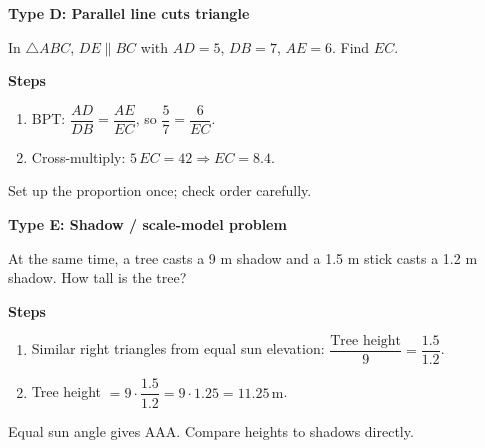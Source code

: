 \documentclass[11pt,a4paper]{article}
\begin{document}
\begin{examplebox}
\textbf{Type D: Parallel line cuts triangle}

In $\triangle ABC$, $DE\parallel BC$ with $AD=5$, $DB=7$, $AE=6$. Find $EC$.

\begin{center}
\end{center}

\textbf{Steps}
\begin{enumerate}
  \item BPT: $\dfrac{AD}{DB} = \dfrac{AE}{EC}$, so $\dfrac{5}{7} = \dfrac{6}{EC}$.
  \item Cross-multiply: $5\,EC = 42 \Rightarrow EC = 8.4$.
\end{enumerate}

\begin{shortcutbox}
Set up the proportion once; check order carefully.
\end{shortcutbox}
\end{examplebox}

\begin{examplebox}
\textbf{Type E: Shadow / scale-model problem}

At the same time, a tree casts a 9 m shadow and a 1.5 m stick casts a 1.2 m shadow. How tall is the tree?

\textbf{Steps}
\begin{enumerate}
  \item Similar right triangles from equal sun elevation: $\dfrac{\text{Tree height}}{9} = \dfrac{1.5}{1.2}$.
  \item Tree height $= 9\cdot \dfrac{1.5}{1.2} = 9\cdot 1.25 = 11.25\,\text{m}$.
\end{enumerate}

\begin{shortcutbox}
Equal sun angle gives AAA. Compare heights to shadows directly.
\end{shortcutbox}
\end{examplebox}
\end{document}
